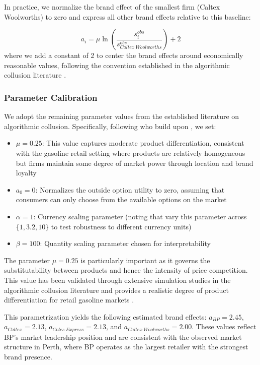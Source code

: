 In practice, we normalize the brand effect of the smallest firm (Caltex Woolworths) to zero and express all other brand effects relative to this baseline:

\begin{equation}
    a_i = \mu \ln\left(\frac{s_i^{obs}}{s_{Caltex\ Woolworths}^{obs}}\right) + 2
\end{equation}
where we add a constant of 2 to center the brand effects around economically reasonable values, following the convention established in the algorithmic collusion literature \parencite{fish_algorithmic_2025}.

\subsubsection*{Parameter Calibration}

We adopt the remaining parameter values from the established literature on algorithmic collusion. Specifically, following \textcite{fish_algorithmic_2025} who build upon \textcite{calvano_artificial_2020}, we set:

\begin{itemize}
    \item $\mu = 0.25$: This value captures moderate product differentiation, consistent with the gasoline retail setting where products are relatively homogeneous but firms maintain some degree of market power through location and brand loyalty
    \item $a_0 = 0$: Normalizes the outside option utility to zero, assuming that consumers can only choose from the available options on the market
    \item $\alpha = 1$: Currency scaling parameter (noting that \textcite{fish_algorithmic_2025} vary this parameter across $\{1, 3.2, 10\}$ to test robustness to different currency units)
    \item $\beta = 100$: Quantity scaling parameter chosen for interpretability
\end{itemize}

The parameter $\mu = 0.25$ is particularly important as it governs the substitutability between products and hence the intensity of price competition. This value has been validated through extensive simulation studies in the algorithmic collusion literature and provides a realistic degree of product differentiation for retail gasoline markets \parencite{calvano_artificial_2020}.

This parametrization yields the following estimated brand effects: $a_{BP} = 2.45$, $a_{Caltex} = 2.13$, $a_{Coles\ Express} = 2.13$, and $a_{Caltex\ Woolworths} = 2.00$. These values reflect BP's market leadership position and are consistent with the observed market structure in Perth, where BP operates as the largest retailer with the strongest brand presence.

